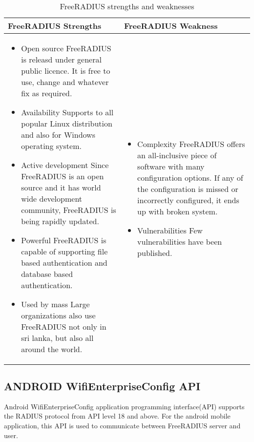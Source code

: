  \paragraph{}
 \begin{center}
 	\begin{table}[H]			
 		\begin{tabu}  { | X[c] | X[c] | }	
 			\hline
 			FreeRADIUS Strengths& FreeRADIUS Weakness \\
 			\hline
 			\begin{itemize}
 				\item Open source
 					\subitem FreeRADIUS is releasd under general public licence. It is free to use, change and whatever fix as required.
 				\item Availability
 					\subitem Supports to all popular Linux distribution and also for Windows operating system.
 				\item Active development
 					\subitem Since FreeRADIUS is an open source and it has world wide development community, FreeRADIUS is being rapidly updated.
 				\item Powerful
 					\subitem FreeRADIUS is capable of supporting file based authentication and  database based authentication.
 				\item Used by mass
 					\subitem Large organizations also use FreeRADIUS not only in sri lanka, but also all around the world.
 			\end{itemize} & 
 			\begin{itemize}
 				\item Complexity
 					\subitem FreeRADIUS offers an all-inclusive piece of software with many configuration options. If any of the configuration is missed or incorrectly configured, it ends up with broken system.
 				\item Vulnerabilities
 					\subitem Few vulnerabilities have been published.
 			\end{itemize}\\
 			\hline
 		\end{tabu}
 		\caption[FreeRADIUS strengths and weaknesses]{FreeRADIUS strengths and weaknesses}
 		\label{table:aimPt_isol}
 	\end{table}
 \end{center} 
 
 
 \subsection{ANDROID WifiEnterpriseConfig API}
 Android WifiEnterpriseConfig application programming interface(API) supports the RADIUS protocol\cite{wpa2_enterprise} from API level 18 and above. For the android mobile application, this API is used to communicate between FreeRADIUS server and user.
 
